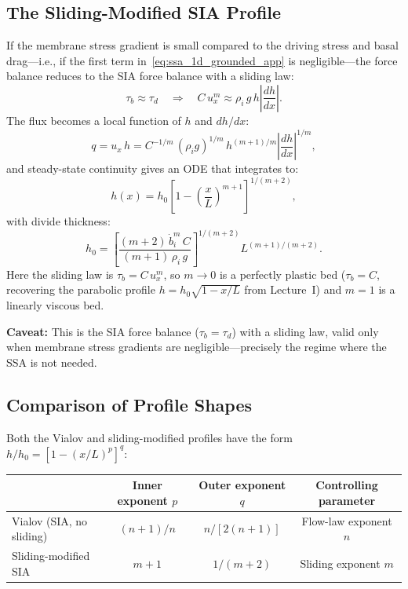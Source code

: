 \documentclass[11pt]{article}
\begin{document}
\subsection{The Sliding-Modified SIA Profile}

If the membrane stress gradient is small compared to the driving stress and basal drag---i.e., if the first term in~\eqref{eq:ssa_1d_grounded_app} is negligible---the force balance reduces to the SIA force balance with a sliding law:
\begin{equation}
  \tau_b \approx \tau_d \quad\Longrightarrow\quad C\,u_x^m \approx \rho_i\,g\,h\left|\frac{dh}{dx}\right|.
\end{equation}
The flux becomes a local function of $h$ and $dh/dx$:
\begin{equation}
  q = u_x\,h = C^{-1/m}\,(\rho_i g)^{1/m}\,h^{(m+1)/m}\left|\frac{dh}{dx}\right|^{1/m},
\end{equation}
and steady-state continuity gives an ODE that integrates to:
\begin{equation}
  \boxed{h(x) = h_0\left[1 - \left(\frac{x}{L}\right)^{m+1}\right]^{1/(m+2)},}
  \label{eq:sliding_sia_profile_app}
\end{equation}
with divide thickness:
\begin{equation}
  h_0 = \left[\frac{(m+2)\,\dot{b}_i^m\,C}{(m+1)\,\rho_i\,g}\right]^{1/(m+2)}\!L^{(m+1)/(m+2)}.
\end{equation}
Here the sliding law is $\tau_b = C\,u_x^m$, so $m \to 0$ is a perfectly plastic bed ($\tau_b = C$, recovering the parabolic profile $h = h_0\sqrt{1 - x/L}$ from Lecture~I) and $m = 1$ is a linearly viscous bed.

\medskip
\noindent\textbf{Caveat:} This is the SIA force balance ($\tau_b = \tau_d$) with a sliding law, valid only when membrane stress gradients are negligible---precisely the regime where the SSA is not needed.

\subsection{Comparison of Profile Shapes}

Both the Vialov and sliding-modified profiles have the form $h/h_0 = [1 - (x/L)^p]^q$:

\begin{center}
\begin{tabular}{lccc}
  \toprule
  & Inner exponent $p$ & Outer exponent $q$ & Controlling parameter \\
  \midrule
  Vialov (SIA, no sliding) & $(n+1)/n$ & $n/[2(n+1)]$ & Flow-law exponent $n$ \\[3pt]
  Sliding-modified SIA & $m + 1$ & $1/(m+2)$ & Sliding exponent $m$ \\
  \bottomrule
\end{tabular}
\end{center}
\end{document}
